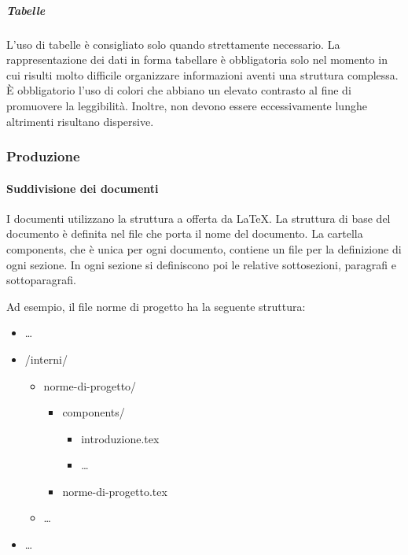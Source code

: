 \documentclass[../norme-di-progetto.tex]{subfiles}
\begin{document}
\subparagraph{Tabelle}%
\label{subp:tabelle}
L'uso di tabelle è consigliato solo quando strettamente necessario. La rappresentazione dei dati in forma tabellare è obbligatoria solo nel momento in cui risulti molto difficile organizzare informazioni aventi una struttura complessa. È obbligatorio l'uso di colori che abbiano un elevato contrasto al fine di promuovere la leggibilità. Inoltre, non devono essere eccessivamente lunghe altrimenti risultano dispersive.

\subsubsection{Produzione}%
\label{subs:produzione}

\paragraph{Suddivisione dei documenti}%
\label{par:suddivisione_dei_documenti}
I documenti utilizzano la struttura a  offerta da \LaTeX.
La struttura di base del documento è definita nel file che porta il nome del documento.
La cartella components, che è unica per ogni documento, contiene un file per la definizione di ogni sezione. In ogni sezione si definiscono poi le relative sottosezioni, paragrafi e sottoparagrafi.

Ad esempio, il file norme di progetto ha la seguente struttura:

\begin{itemize}
  \item[] \ldots
  \item[] /interni/
        \begin{itemize}
          \item[] norme-di-progetto/
                \begin{itemize}
                  \item[] components/
                        \begin{itemize}
                          \item[] introduzione.tex
                          \item[] \ldots
                        \end{itemize}
                  \item[] norme-di-progetto.tex
                \end{itemize}
          \item[] \ldots
        \end{itemize}
  \item[] \ldots
\end{itemize}
\end{document}
